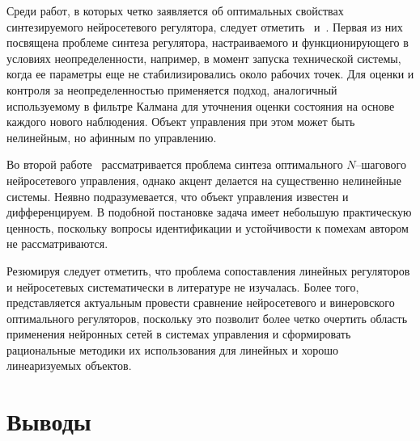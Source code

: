 Среди работ, в которых четко заявляется об оптимальных свойствах
синтезируемого нейросетевого регулятора, следует
отметить~\cite{fabri98} и~\cite{liao99}.  Первая из них посвящена
проблеме синтеза регулятора, настраиваемого и функционирующего в
условиях неопределенности, например, в момент запуска технической
системы, когда ее параметры еще не стабилизировались около рабочих
точек.  Для оценки и контроля за неопределенностью применяется подход,
аналогичный используемому в фильтре Калмана для уточнения оценки
состояния на основе каждого нового наблюдения.  Объект управления при
этом может быть нелинейным, но афинным по управлению.

Во второй работе~\cite{liao99} рассматривается проблема синтеза
оптимального $N$--шагового нейросетевого управления, однако акцент
делается на существенно нелинейные системы.  Неявно подразумевается,
что объект управления известен и дифференцируем.  В подобной
постановке задача имеет небольшую практическую ценность, поскольку
вопросы идентификации и устойчивости к помехам автором не
рассматриваются.

Резюмируя следует отметить, что проблема сопоставления линейных
регуляторов и нейросетевых систематически в литературе не изучалась.
Более того, представляется актуальным провести сравнение нейросетевого
и винеровского оптимального регуляторов, поскольку это позволит более
четко очертить область применения нейронных сетей в системах
управления и сформировать рациональные методики их использования для
линейных и хорошо линеаризуемых объектов.




\section{Выводы}

